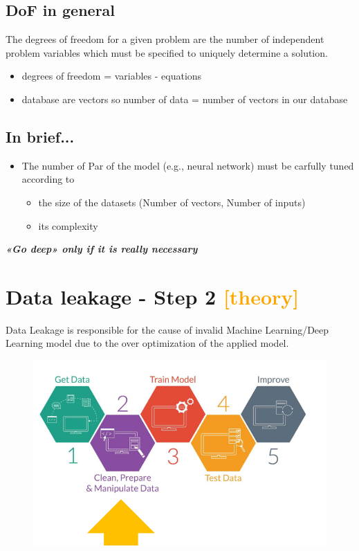 \subsection{DoF in general}
\noindent The degrees of freedom for a given problem are the number of independent problem variables which must be specified to uniquely determine a solution.

\begin{itemize}
    \item degrees of freedom = variables - equations
    \item database are vectors so number of data = number of vectors in our database
\end{itemize}

\subsection{In brief...}
\begin{itemize}
    \item The number of Par of the model (e.g., neural network) must be carfully tuned according to
    \begin{itemize}
        \item the size of the datasets (Number of vectors, Number of inputs)
        \item its complexity 
    \end{itemize}
\end{itemize}

\noindent \textbf{\textit{«Go deep» only if it is really necessary }}


\section{Data leakage - Step 2 \textcolor{orange}{[theory]}}
\noindent Data Leakage is responsible for the cause of invalid Machine Learning/Deep Learning model due to the over optimization of the applied model.
\begin{figure}[H]
    \centering
    \includegraphics[width=0.8\linewidth]{07-08/images/step2.png}
\end{figure}


